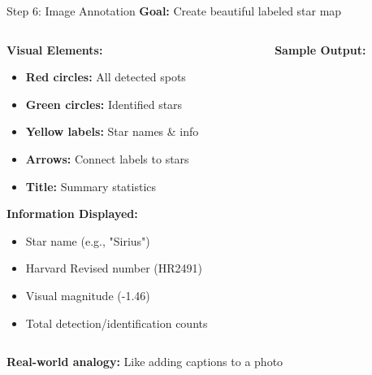 \documentclass[aspectratio=169]{beamer}
\begin{document}
\begin{frame}{Step 6: Image Annotation}
\textbf{Goal:} Create beautiful labeled star map

\begin{columns}
\begin{column}{0.5\textwidth}
\textbf{Visual Elements:}
\begin{itemize}
\item \textcolor{starred}{\textbf{Red circles:}} All detected spots
\item \textcolor{stargreen}{\textbf{Green circles:}} Identified stars  
\item \textbf{Yellow labels:} Star names \& info
\item \textbf{Arrows:} Connect labels to stars
\item \textbf{Title:} Summary statistics
\end{itemize}

\textbf{Information Displayed:}
\begin{itemize}
\item Star name (e.g., "Sirius")
\item Harvard Revised number (HR2491)
\item Visual magnitude (-1.46)
\item Total detection/identification counts
\end{itemize}
\end{column}

\begin{column}{0.5\textwidth}
\begin{center}
\textbf{Sample Output:}
\\[0.5cm]
\end{center}
\end{column}
\end{columns}

\textbf{Real-world analogy:} \textcolor{starblue}{Like adding captions to a photo}
\end{frame}
\end{document}
